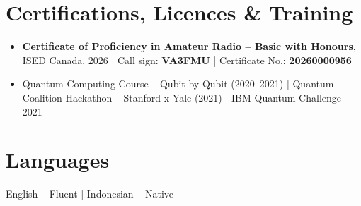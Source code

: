 \documentclass[a4paper,10pt]{article}
\begin{document}

\section*{Certifications, Licences \& Training}

\begin{itemize}
    \item \textbf{Certificate of Proficiency in Amateur Radio -- Basic with Honours},
    ISED Canada, 2026 \;|\; Call sign: \textbf{VA3FMU}
    \;|\; Certificate No.: \textbf{20260000956}
    \item Quantum Computing Course -- Qubit by Qubit (2020--2021)
    \;|\; Quantum Coalition Hackathon -- Stanford x Yale (2021)
    \;|\; IBM Quantum Challenge 2021
\end{itemize}


\section*{Languages}

English -- Fluent \;|\; Indonesian -- Native
\end{document}
